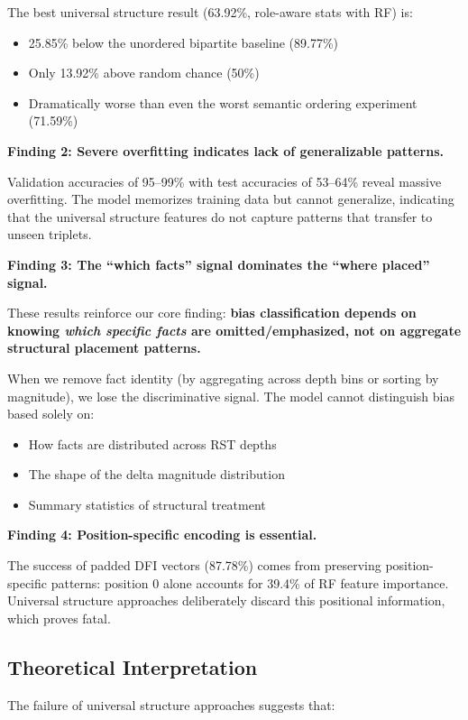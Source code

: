 \documentclass[12pt,a4paper]{article}
\begin{document}
The best universal structure result (63.92\%, role-aware stats with RF) is:
\begin{itemize}
\item 25.85\% below the unordered bipartite baseline (89.77\%)
\item Only 13.92\% above random chance (50\%)
\item Dramatically worse than even the worst semantic ordering experiment (71.59\%)
\end{itemize}

\textbf{Finding 2: Severe overfitting indicates lack of generalizable patterns.}

Validation accuracies of 95--99\% with test accuracies of 53--64\% reveal massive overfitting.
The model memorizes training data but cannot generalize, indicating that the universal structure
features do not capture patterns that transfer to unseen triplets.

\textbf{Finding 3: The ``which facts'' signal dominates the ``where placed'' signal.}

These results reinforce our core finding: \textbf{bias classification depends on knowing
\textit{which specific facts} are omitted/emphasized, not on aggregate structural placement patterns.}

When we remove fact identity (by aggregating across depth bins or sorting by magnitude),
we lose the discriminative signal. The model cannot distinguish bias based solely on:
\begin{itemize}
\item How facts are distributed across RST depths
\item The shape of the delta magnitude distribution
\item Summary statistics of structural treatment
\end{itemize}

\textbf{Finding 4: Position-specific encoding is essential.}

The success of padded DFI vectors (87.78\%) comes from preserving position-specific patterns:
position 0 alone accounts for 39.4\% of RF feature importance. Universal structure approaches
deliberately discard this positional information, which proves fatal.

\subsection{Theoretical Interpretation}

The failure of universal structure approaches suggests that:
\end{document}
